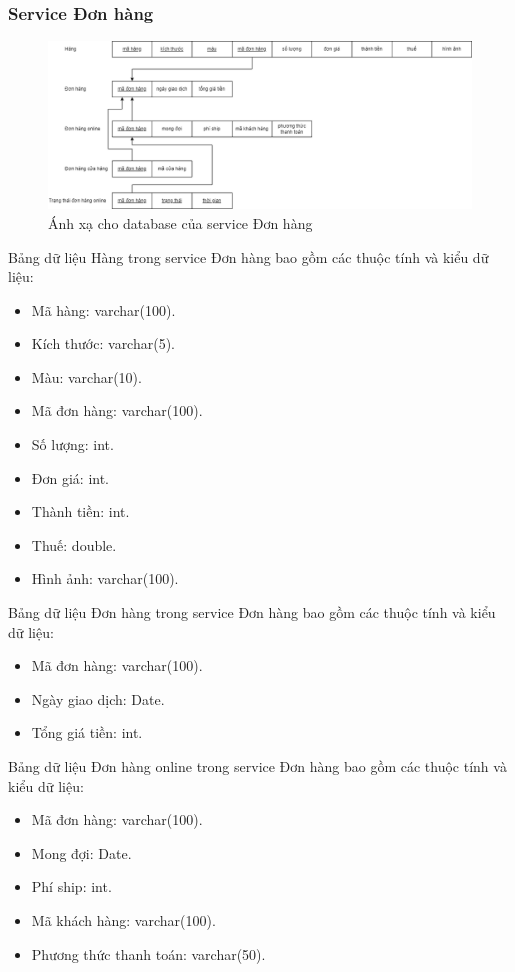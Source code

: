 \subsubsection{Service Đơn hàng}
\begin{figure}[!htp]
	\begin{center}
		\includegraphics[width=1\textwidth]{img/database/mapping/mapping-đơnhàng.png}
		\newline
		\caption{Ánh xạ cho database của service Đơn hàng}
	\end{center}
\end{figure}
Bảng dữ liệu Hàng trong service Đơn hàng bao gồm các thuộc tính và kiểu dữ liệu:
\begin{itemize}
	\item Mã hàng: varchar(100).
	\item Kích thước: varchar(5).
	\item Màu: varchar(10).
	\item Mã đơn hàng: varchar(100).
	\item Số lượng: int.
	\item Đơn giá: int.
	\item Thành tiền: int.
	\item Thuế: double.
	\item Hình ảnh: varchar(100).
\end{itemize}

Bảng dữ liệu Đơn hàng trong service Đơn hàng bao gồm các thuộc tính và kiểu dữ liệu:
\begin{itemize}
	\item Mã đơn hàng: varchar(100).
	\item Ngày giao dịch: Date.
	\item Tổng giá tiền: int.
\end{itemize}

Bảng dữ liệu Đơn hàng online trong service Đơn hàng bao gồm các thuộc tính và kiểu dữ liệu:
\begin{itemize}
	\item Mã đơn hàng: varchar(100).
	\item Mong đợi: Date.
	\item Phí ship: int.
	\item Mã khách hàng: varchar(100).
	\item Phương thức thanh toán: varchar(50).
\end{itemize}

